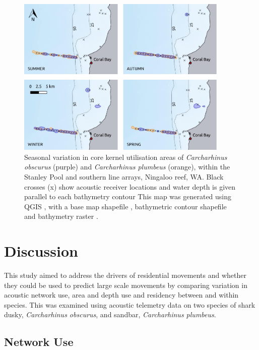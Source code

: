\documentclass[11pt,a4paper]{article}
\begin{document}
\newpage
	
	\begin{figure}[h!]
		\centering\includegraphics[width=0.9\textwidth]{../Results/Coral_bay.pdf}
		\caption{Seasonal variation in core kernel utilisation areas of \textit{Carcharhinus obscurus} (purple) and \textit{Carcharhinus plumbeus} (orange), within the Stanley Pool and southern line arrays, Ningaloo reef, WA. Black crosses (x) show acoustic receiver locations and water depth is given parallel to each bathymetry contour This map was generated using QGIS \citep{QGISDevelopmentTeam2019}, with a base map shapefile \citep{AustralianBureauofStatistics2011}, bathymetric contour shapefile \citep{GEBCOCompilationGroup2019} and bathymetry raster \citep{Whiteway2009}.}
		\label{depth_south}
	\end{figure}

	\pagebreak
	
	\section{Discussion}
	
	This study aimed to address the drivers of residential movements and whether they could be used to predict large scale movements by comparing variation in acoustic network use, area and depth use and residency between and within species. This was examined using acoustic telemetry data on two species of shark dusky, \textit{Carcharhinus obscurus}, and sandbar, \textit{Carcharhinus plumbeus}.

	\subsection{Network Use}
	
\end{document}

